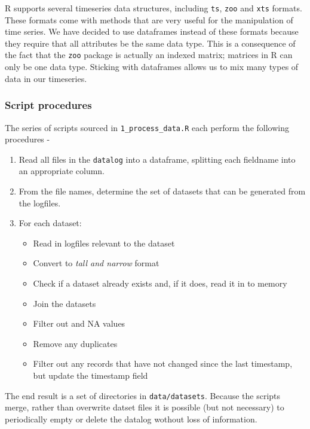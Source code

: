 \documentclass[11pt,preprint, authoryear]{elsarticle}
\numberwithin{equation}{section}
\numberwithin{figure}{section}
\numberwithin{table}{section}
\def\tightlist{} %
\begin{document}
R supports several timeseries data structures, including \texttt{ts},
\texttt{zoo} and \texttt{xts} formats. These formats come with methods
that are very useful for the manipulation of time series. We have
decided to use dataframes instead of these formats because they require
that all attributes be the same data type. This is a consequence of the
fact that the \texttt{zoo} package is actually an indexed matrix;
matrices in R can only be one data type. Sticking with dataframes allows
us to mix many types of data in our timeseries.

\subsubsection{Script procedures}\label{script-procedures}

The series of scripts sourced in \texttt{1\_process\_data.R} each
perform the following procedures -

\begin{enumerate}
\def\labelenumi{\arabic{enumi}.}
\tightlist
\item
  Read all files in the \texttt{datalog} into a dataframe, splitting
  each fieldname into an appropriate column.
\item
  From the file names, determine the set of datasets that can be
  generated from the logfiles.
\item
  For each dataset:

  \begin{itemize}
  \tightlist
  \item
    Read in logfiles relevant to the dataset
  \item
    Convert to \emph{tall and narrow} format
  \item
    Check if a dataset already exists and, if it does, read it in to
    memory
  \item
    Join the datasets
  \item
    Filter out and NA values
  \item
    Remove any duplicates
  \item
    Filter out any records that have not changed since the last
    timestamp, but update the timestamp field
  \end{itemize}
\end{enumerate}

The end result is a set of directories in \texttt{data/datasets}.
Because the scripts merge, rather than overwrite datset files it is
possible (but not necessary) to periodically empty or delete the datalog
wothout loss of information.
\end{document}
